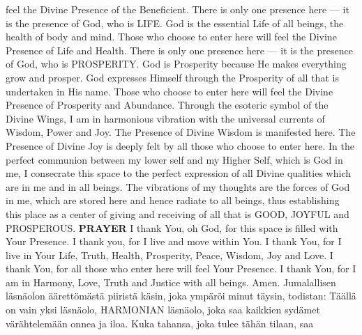 {\begin{songs}{}
        feel the Divine Presence of the Beneficient.
        \parspace
        There is only one presence here --- it is the
        presence of God, who is LIFE. God is the essential
        Life of all beings, the health of body and mind.
        Those who choose to enter here will feel the Divine
        Presence of Life and Health.
        \parspace
        There is only one presence here --- it is the
        presence of God, who is PROSPERITY. God is
        Prosperity because He makes everything grow and
        prosper. God expresses Himself through the
        Prosperity of all that is undertaken in His name.
        Those who choose to enter here will feel the
        Divine Presence of Prosperity and Abundance.
        \parspace
        Through the esoteric symbol of the Divine Wings,
        I am in harmonious vibration with the universal
        currents of Wisdom, Power and Joy. The Presence
        of Divine Wisdom is manifested here. The Presence
        of Divine Joy is deeply felt by all those who choose
        to enter here.
        \parspace
        In the perfect communion between my lower self and
        my Higher Self, which is God in me, I consecrate
        this space to the perfect expression of all Divine
        qualities which are in me and in all beings.
        \parspace
        The vibrations of my thoughts are the forces of God
        in me, which are stored here and hence radiate to
        all beings, thus establishing this place as a center
        of giving and receiving of all that is GOOD, JOYFUL
        and PROSPEROUS.
        \parspace
        \textbf{PRAYER}
        \parspace
        I thank You, oh God, for this space is filled with
        Your Presence.
        \parspace
        I thank you, for I live and move within You.
        \parspace
        I thank You, for I live in Your Life, Truth, Health,
        Prosperity, Peace, Wisdom, Joy and Love.
        \parspace
        I thank You, for all those who enter here will feel
        Your Presence.
        \parspace
        I thank You, for I am in Harmony, Love, Truth and
        Justice with all beings.
        \parspace
        Amen.
      \endverse
      \beginverse\color{finnishcolor}
        \parspace
        Jumalallisen läsnäolon äärettömästä piiristä käsin,
        joka ympäröi minut täysin, todistan:
        \parspace
        Täällä on vain yksi läsnäolo, HARMONIAN läsnäolo,
        joka saa kaikkien sydämet värähtelemään  onnea ja
        iloa. Kuka tahansa, joka tulee tähän tilaan, saa

\end{songs}}
